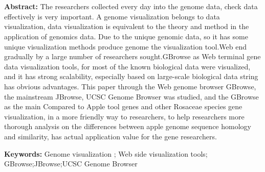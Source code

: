 \chapter*{\LARGE \heiti \enthtopic}

\vspace{1em}

\textbf {\large Abstract: }\normalsize{The researchers collected every day into the genome data, check data effectively is very important. A genome visualization belongs to data visualization, data visualization is equivalent to the theory and method in the application of genomics data. Due to the unique genomic data, so it has some unique visualization methods produce genome the visualization tool.Web end gradually by a large number of researchers sought.GBrowse as Web terminal gene data visualization tools, for most of the known biological data were visualized, and it has strong scalability, especially based on large-scale biological data string has obvious advantages. This paper through the Web genome browser GBrowse, the mainstream JBrowse, UCSC Genome Browser was studied, and the GBrowse as the main Compared to Apple tool genes and other Rosaceae species gene visualization, in a more friendly way to researchers, to help researchers more thorough analysis on the differences between apple genome sequence homology and similarity, has actual application value for the gene researchers.}

\textbf{\large Keywords: }\normalsize{Genome visualization ; Web side visualization tools; GBrowse;JBrowse;UCSC Genome Browser}
\thispagestyle{empty}
